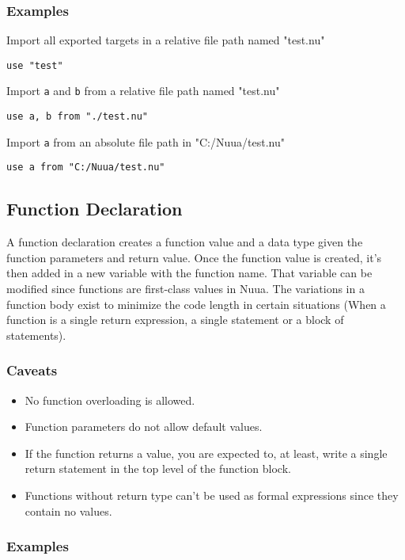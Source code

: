 \subsubsection{Examples}

Import all exported targets in a relative file path named "test.nu"
\begin{verbatim}
use "test"
\end{verbatim}
Import \texttt{a} and \texttt{b} from a relative file path named "test.nu"
\begin{verbatim}
use a, b from "./test.nu"
\end{verbatim}
Import \texttt{a} from an absolute file path in "C:/Nuua/test.nu"
\begin{verbatim}
use a from "C:/Nuua/test.nu"
\end{verbatim}

\subsection{Function Declaration}
\label{sec:statements_function}

A function declaration creates a function value and a data type given the function parameters and return value.
Once the function value is created, it's then added in a new variable with the function name. That variable can be
modified since functions are first-class values in Nuua. The variations in a function body exist to minimize the
code length in certain situations (When a function is a single return expression, a single statement or a block of statements).

\subsubsection{Caveats}

\begin{itemize}
    \item No function overloading is allowed.
    \item Function parameters do not allow default values.
    \item If the function returns a value, you are expected to, at least, write a single return statement in the top level of the
        function block.
    \item Functions without return type can't be used as formal expressions since they contain no values.
\end{itemize}

\subsubsection{Examples}

